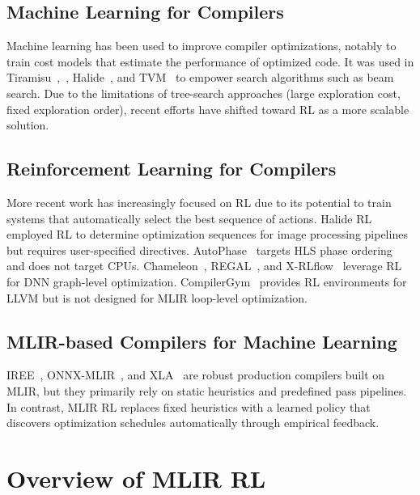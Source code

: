 \documentclass[10pt,twocolumn]{article}
\begin{document}
\subsection{Machine Learning for Compilers}

Machine learning has been used to improve compiler optimizations, notably to train cost models that estimate the performance of optimized code. It was used in Tiramisu~\cite{ref5},~\cite{ref38}, Halide~\cite{ref3}, and TVM~\cite{ref46} to empower search algorithms such as beam search. Due to the limitations of tree-search approaches (large exploration cost, fixed exploration order), recent efforts have shifted toward RL as a more scalable solution.

\subsection{Reinforcement Learning for Compilers}

More recent work has increasingly focused on RL due to its potential to train systems that automatically select the best sequence of actions. Halide RL~\cite{ref6} employed RL to determine optimization sequences for image processing pipelines but requires user-specified directives. AutoPhase~\cite{ref10} targets HLS phase ordering and does not target CPUs. Chameleon~\cite{ref7}, REGAL~\cite{ref47}, and X-RLflow~\cite{ref48} leverage RL for DNN graph-level optimization. CompilerGym~\cite{ref13} provides RL environments for LLVM but is not designed for MLIR loop-level optimization.

\subsection{MLIR-based Compilers for Machine Learning}

IREE~\cite{ref49}, ONNX-MLIR~\cite{ref50}, and XLA~\cite{ref51} are robust production compilers built on MLIR, but they primarily rely on static heuristics and predefined pass pipelines. In contrast, MLIR RL replaces fixed heuristics with a learned policy that discovers optimization schedules automatically through empirical feedback.

\section{Overview of MLIR RL}
\end{document}
